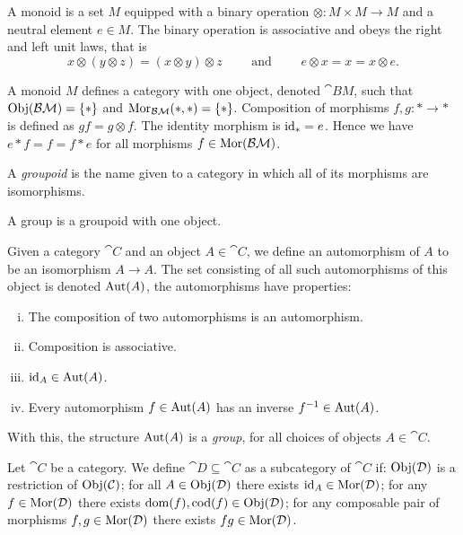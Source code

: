 \begin{definition}[Monoid]\label{def: monoid}
A monoid is a set \(M\) equipped with a binary operation \(\otimes: M \times M
\to M\) and a neutral element \(e \in M\). The binary operation is associative
and obeys the right and left unit laws, that is
\[
  x \otimes (y \otimes z) = (x \otimes y) \otimes z \qquad \text{ and } \qquad
  e \otimes x = x = x \otimes e.
\]
\end{definition}

\begin{example}
A monoid \(M\) defines a category with one object, denoted \(\cat{BM}\), such
that \(\operatorname{Obj}(\mathcal{BM}) = \{*\}\) and \(\operatorname{Mor}_{\mathcal{BM}}(*, *) =
\{*\}\). Composition of morphisms \(f, g: * \to *\) is defined as \(g f = g
\otimes f\). The identity morphism is \(\operatorname{id}_* = e\). Hence we have \(e * f = f =
f * e\) for all morphisms \(f \in \operatorname{Mor}(\mathcal{BM})\).
\end{example}

\begin{definition}[Groupoids]\label{def: groupoids}
A \emph{groupoid} is the name given to a category in which all of its
morphisms are isomorphisms.
\end{definition}

\begin{definition}[Group]\label{def: group}
A group is a groupoid with one object.
\end{definition}

\begin{definition}[Automorphism]
Given a category \(\cat C\) and an object  \(A \in \cat C\), we define an
automorphism of \(A\) to be an isomorphism \(A \to A\). The set consisting of
all such automorphisms of this object is denoted \(\operatorname{Aut}(A)\), the
automorphisms have properties:
\begin{enumerate}[i.]
\item The composition of two automorphisms is an automorphism.
\item Composition is associative.
\item \(\operatorname{id}_A \in \operatorname{Aut}(A)\).
\item Every automorphism \(f \in \operatorname{Aut}(A)\) has an inverse \(f^{-1}
    \in \operatorname{Aut}(A)\).
\end{enumerate}
With this, the structure \(\operatorname{Aut}(A)\) is a \emph{group}, for all choices of
objects \(A \in \cat{C}\).
\end{definition}

\begin{definition}[Subcategory]\label{def: subcategory}
Let \(\cat C\) be a category. We define \(\cat D \subseteq \cat C\) as a
subcategory of \(\cat C\) if: \(\operatorname{Obj}(\mathcal D)\) is a restriction of \(\operatorname{Obj}(\mathcal
C)\); for all \(A \in \operatorname{Obj}(\mathcal D)\) there exists \(\operatorname{id}_A \in \operatorname{Mor}(\mathcal D)\);
for any \(f \in \operatorname{Mor}(\mathcal D)\) there exists \(\operatorname{dom}(f), \operatorname{cod}(f) \in
\operatorname{Obj}(\mathcal D)\); for any composable pair of morphisms \(f, g \in \operatorname{Mor}(\mathcal D)\)
there exists \(f g \in \operatorname{Mor}(\mathcal D)\).
\end{definition}

